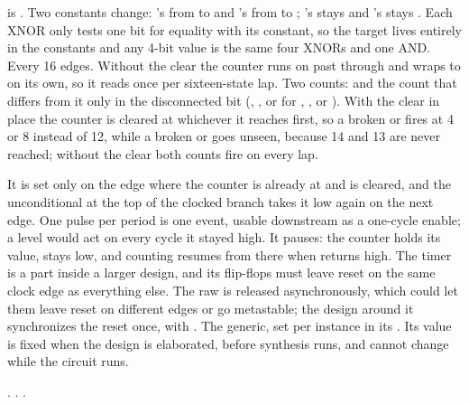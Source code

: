 

 is . Two constants change: 's from  to  and
's from  to ; 's stays  and 's stays .
Each XNOR only tests one bit for equality with its constant, so the target lives entirely in the
constants and any 4-bit value is the same four XNORs and one AND.
Every 16 edges. Without the clear the counter runs on past  through 
and wraps to  on its own, so it reads  once per sixteen-state lap.
Two counts:  and the count that differs from it only in the disconnected bit
(, ,  or  for , ,  or
). With the clear in place the counter is cleared at whichever it reaches first, so a
broken  or  fires at 4 or 8 instead of 12, while a broken  or 
goes unseen, because 14 and 13 are never reached; without the clear both counts fire on every lap.

It is set only on the edge where the counter is already at  and is cleared,
and the unconditional  at the top of the clocked branch takes it low again on
the next edge. One pulse per period is one event, usable downstream as a one-cycle enable; a level
would act on every cycle it stayed high.
It pauses: the counter holds its value,  stays low, and counting resumes from
there when  returns high.
The timer is a part inside a larger design, and its flip-flops must leave reset on the same
clock edge as everything else. The raw  is released asynchronously, which could let
them leave reset on different edges or go metastable; the design around it synchronizes the reset
once, with .
The  generic, set per instance in its . Its value is fixed
when the design is elaborated, before synthesis runs, and cannot change while the circuit runs.

.
.
.

